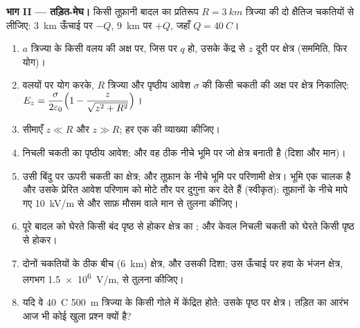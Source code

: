 \begin{problem}[{सप्ताहांत समस्या --- साफ़ मौसम का क्षेत्र, तड़ित-मेघ,
बिजली का आघात, और गुरुत्व पर घुमाया गया गाउस का नियम}]
\medskip
\noindent\textbf{भाग II --- तड़ित-मेघ।}
किसी तूफ़ानी बादल का प्रतिरूप $R = \qty{3}{km}$ त्रिज्या की दो क्षैतिज
चकतियों से लीजिए: \qty{3}{km} ऊँचाई पर $-Q$, \qty{9}{km} पर $+Q$, जहाँ $Q = \qty{40}{C}$।
\begin{enumerate}[resume]
  \item $a$ त्रिज्या के किसी वलय की अक्ष पर, जिस पर $q$ हो, उसके केंद्र
        से $z$ दूरी पर क्षेत्र (सममिति, फिर योग)।
  \item वलयों पर योग करके, $R$ त्रिज्या और पृष्ठीय आवेश $\sigma$ की किसी
        चकती की अक्ष पर क्षेत्र निकालिए:
        $E_z = \dfrac{\sigma}{2\varepsilon_0}\Bigl(1 - \dfrac{z}{\sqrt{z^2 + R^2}}\Bigr)$।
  \item सीमाएँ $z \ll R$ और $z \gg R$; हर एक की व्याख्या कीजिए।
  \item निचली चकती का पृष्ठीय आवेश; और वह ठीक नीचे भूमि पर जो क्षेत्र
        बनाती है (दिशा और मान)।
  \item उसी बिंदु पर ऊपरी चकती का क्षेत्र; और तूफ़ान के नीचे भूमि पर
        परिणामी क्षेत्र। भूमि एक चालक है और उसके प्रेरित आवेश परिणाम को
        मोटे तौर पर दुगुना कर देते हैं (स्वीकृत): तूफ़ानों के नीचे मापे गए
        \qty{10}{kV/m} से और साफ़ मौसम वाले मान से तुलना कीजिए।
  \item पूरे बादल को घेरते किसी बंद पृष्ठ से होकर क्षेत्र का ; और
        केवल निचली चकती को घेरते किसी पृष्ठ से होकर।
  \item दोनों चकतियों के ठीक बीच (\qty{6}{km}) क्षेत्र, और उसकी दिशा; उस
        ऊँचाई पर हवा के भंजन क्षेत्र, लगभग \qty{1.5e6}{V/m}, से तुलना
        कीजिए।
  \item यदि वे \qty{40}{C} \qty{500}{m} त्रिज्या के किसी गोले में
        केंद्रित होते: उसके पृष्ठ पर क्षेत्र। तड़ित का आरंभ आज भी कोई खुला
        प्रश्न क्यों है?
\end{enumerate}


\end{problem}
